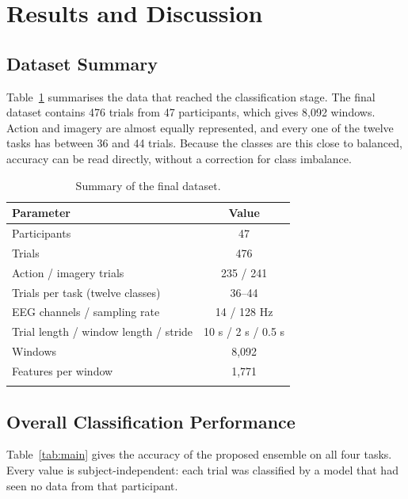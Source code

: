 \documentclass[pdflatex,sn-mathphys-num]{sn-jnl}%
\theoremstyle{thmstyleone}%
\theoremstyle{thmstyletwo}%
\theoremstyle{thmstylethree}%
\begin{document}
\FloatBarrier
\section{Results and Discussion}\label{sec:results}

\subsection{Dataset Summary}\label{subsec:data}

Table~\ref{tab:dataset} summarises the data that reached the classification stage. The final dataset contains 476 trials from 47 participants, which gives 8,092 windows. Action and imagery are almost equally represented, and every one of the twelve tasks has between 36 and 44 trials. Because the classes are this close to balanced, accuracy can be read directly, without a correction for class imbalance.

\begin{table}[htbp]
\centering
\caption{Summary of the final dataset.}
\label{tab:dataset}
\footnotesize
\begin{tabular}{@{}lc@{}}
\toprule
\textbf{Parameter} & \textbf{Value} \\
\midrule
Participants & 47 \\
Trials & 476 \\
Action / imagery trials & 235 / 241 \\
Trials per task (twelve classes) & 36--44 \\
EEG channels / sampling rate & 14 / 128 Hz \\
Trial length / window length / stride & 10 s / 2 s / 0.5 s \\
Windows & 8,092 \\
Features per window & 1,771 \\
\botrule
\end{tabular}
\end{table}

\subsection{Overall Classification Performance}\label{subsec:main}

Table~\ref{tab:main} gives the accuracy of the proposed ensemble on all four tasks. Every value is subject-independent: each trial was classified by a model that had seen no data from that participant.
\end{document}
